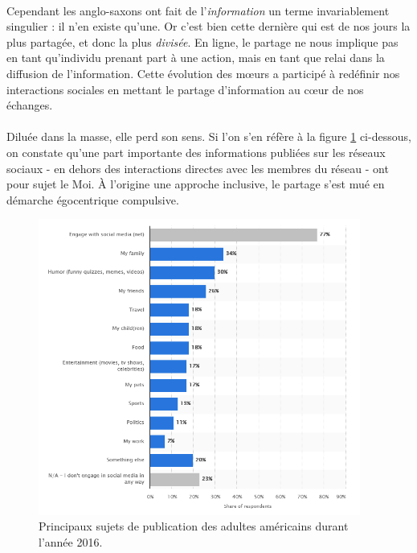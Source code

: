 \paragraph{} Cependant les anglo-saxons ont fait de l'\emph{information} un terme invariablement singulier : il n'en existe qu'une.
Or c'est bien cette dernière qui est de nos jours la plus partagée, et donc la plus \emph{divisée}. En ligne, le partage 
ne nous implique pas en tant qu'individu prenant part à une action, mais en tant que relai dans la diffusion de l'information. 
Cette évolution des m\oe{}urs a participé à redéfinir nos interactions sociales en mettant le partage d'information au 
c\oe{}ur de nos échanges.

\paragraph{} Diluée dans la masse, elle perd son sens. Si l'on s'en réfère à la figure \ref{social_media_sharing} ci-dessous,
on constate qu'une part importante des informations publiées sur les réseaux sociaux - en dehors des interactions directes 
avec les membres du réseau - ont pour sujet le Moi. À l'origine une approche inclusive, le partage s'est mué en démarche 
égocentrique compulsive.

\begin{figure}[h]
    \centering
    \includegraphics[width=400px]{chapters/01/images/social_media_sharing.png}
    \caption{\label{social_media_sharing} Principaux sujets de publication des adultes américains durant l'année 2016. \cite{SocialMedia1}}
\end{figure}

